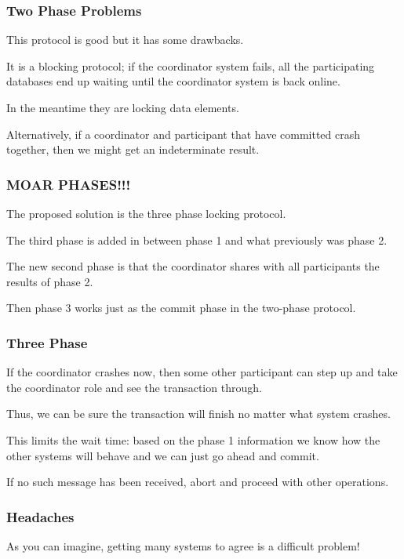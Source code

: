 \begin{frame}
\frametitle{Two Phase Problems}

This protocol is good but it has some drawbacks. 

It is a blocking protocol; if the coordinator system fails, all the participating databases end up waiting until the coordinator system is back online. 

In the meantime they are locking data elements.

Alternatively, if a coordinator and participant that have committed crash together, then we might get an indeterminate result.

\end{frame}

\begin{frame}
\frametitle{MOAR PHASES!!!}

The proposed solution is the \alert{three phase locking protocol}. 

The third phase is added in between phase 1 and what previously was phase 2. 

The new second phase is that the coordinator shares with all participants the results of phase 2. 

Then phase 3 works just as the commit phase in the two-phase protocol.

\end{frame}

\begin{frame}
\frametitle{Three Phase}
If the coordinator crashes now, then some other participant can step up and take the coordinator role and see the transaction through. 

Thus, we can be sure the transaction will finish no matter what system crashes. 

This limits the wait time: based on the phase 1 information we know how the other systems will behave and we can just go ahead and commit. 

If no such message has been received, abort and proceed with other operations.

\end{frame}


\begin{frame}
\frametitle{Headaches}

As you can imagine, getting many systems to agree is a difficult problem!


\end{frame}





